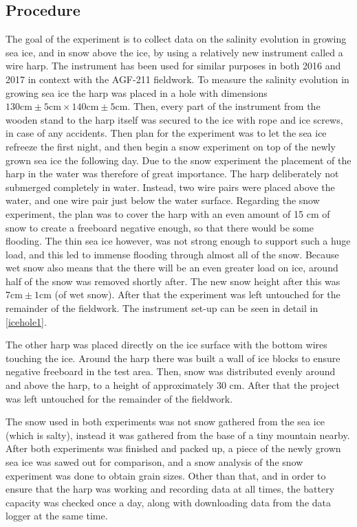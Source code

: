 \subsection{Procedure}
The goal of the experiment is to collect data on the salinity evolution in growing sea ice, and in snow above the ice, by using a relatively new instrument called a wire harp. The instrument has been used for similar purposes in both 2016 and 2017 in context with the AGF-211 fieldwork. To measure the salinity evolution in growing sea ice the harp was placed in a hole with dimensions $ 130 \text{cm} \pm 5\text{cm} \times 140 \text{cm} \pm 5\text{cm}$. Then, every part of the instrument from the wooden stand to the harp itself was secured to the ice with rope and ice screws, in case of any accidents. Then plan for the experiment was to let the sea ice refreeze the first night, and then begin a snow experiment on top of the newly grown sea ice the following day. Due to the snow experiment the placement of the harp in the water was therefore of great importance. The harp deliberately not submerged completely in water. Instead, two wire pairs were placed above the water, and one wire pair just below the water surface. Regarding the snow experiment, the plan was to cover the harp with an even amount of 15 cm of snow to create a freeboard negative enough, so that there would be some flooding. The thin sea ice however, was not strong enough to support such a huge load, and this led to immense flooding through almost all of the snow. Because wet snow also means that the there will be an even greater load on ice, around half of the snow was removed shortly after. The new snow height after this was $7 \text{cm} \pm 1\text{cm}$ (of wet snow). After that the experiment was left untouched for the remainder of the fieldwork. The instrument set-up can be seen in detail in \autoref{icehole1}.

The other harp was placed directly on the ice surface with the bottom wires touching the ice. Around the harp there was built a wall of ice blocks to ensure negative freeboard in the test area. Then, snow  was distributed evenly around and above the harp, to a height of approximately 30 cm. After that the project was left untouched for the remainder of the fieldwork.

The snow used in both experiments was not snow gathered from the sea ice (which is salty), instead it was gathered from the base of a tiny mountain nearby. After both experiments was finished and packed up, a piece of the newly grown sea ice was sawed out for comparison, and a snow analysis of the snow experiment was done to obtain grain sizes. Other than that, and in order to ensure that the harp was working and recording data at all times, the battery capacity was checked once a day, along with downloading data from the data logger at the same time.

